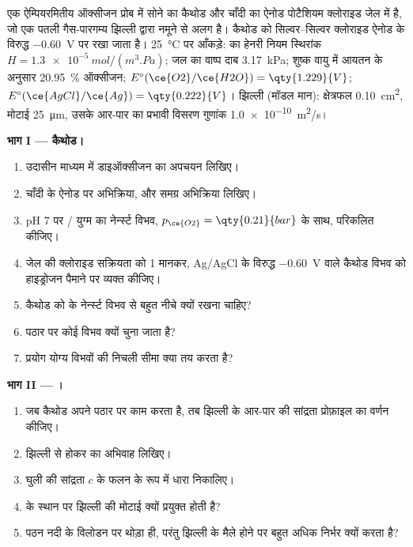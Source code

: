 \begin{problem}
\label{pb:b2:current-potential-curves:1}
एक ऐम्पियरमितीय ऑक्सीजन प्रोब में सोने का कैथोड और चाँदी का ऐनोड
पोटैशियम क्लोराइड जेल में है, जो एक पतली गैस-पारगम्य
झिल्ली द्वारा नमूने से अलग है। कैथोड को सिल्वर--सिल्वर
क्लोराइड ऐनोड के विरुद्ध \qty{-0.60}{V} पर रखा जाता है। \qty{25}{\degreeCelsius} पर आँकड़े:
 का हेनरी नियम स्थिरांक $H = \qty{1.3e-5}{mol/(m^3.Pa)}$; जल का वाष्प दाब
\qty{3.17}{kPa}; शुष्क वायु में आयतन के अनुसार 20.95~\% ऑक्सीजन; $E^\circ(\ce{O2}/\ce{H2O}) =
\qty{1.229}{V}$; $E^\circ(\ce{AgCl}/\ce{Ag}) = \qty{0.222}{V}$। झिल्ली (मॉडल
मान): क्षेत्रफल \qty{0.10}{cm^2}, मोटाई \qty{25}{\micro m}, उसके आर-पार  का
प्रभावी विसरण गुणांक \qty{1.0e-10}{m^2/s}।

\medskip
\noindent\textbf{भाग I --- कैथोड।}
\begin{enumerate}
  \item उदासीन माध्यम में डाइऑक्सीजन का अपचयन लिखिए।
  \item चाँदी के ऐनोड पर अभिक्रिया, और समग्र अभिक्रिया लिखिए।
  \item pH 7 पर / युग्म का नेर्न्स्ट विभव,
        $p_{\ce{O2}} = \qty{0.21}{bar}$ के साथ, परिकलित कीजिए।
  \item जेल की क्लोराइड सक्रियता को 1 मानकर, Ag/AgCl के विरुद्ध \qty{-0.60}{V} वाले कैथोड
        विभव को हाइड्रोजन पैमाने पर व्यक्त कीजिए।
  \item कैथोड को  के नेर्न्स्ट विभव से बहुत नीचे क्यों रखना चाहिए?
  \item पठार पर कोई विभव क्यों चुना जाता है?
  \item प्रयोग योग्य विभवों की निचली सीमा क्या तय करता है?
\end{enumerate}

\medskip
\noindent\textbf{भाग II --- ।}
\begin{enumerate}[resume]
  \item जब कैथोड अपने पठार पर काम करता है, तब झिल्ली के आर-पार  की
        सांद्रता प्रोफ़ाइल का वर्णन कीजिए।
  \item झिल्ली से होकर  का अभिवाह लिखिए।
  \item घुली  की सांद्रता $c$ के फलन के रूप में धारा
        निकालिए।
  \item {} के स्थान पर झिल्ली की मोटाई क्यों प्रयुक्त होती है?
  \item पठन नदी के विलोडन पर थोड़ा ही, परंतु झिल्ली के मैले होने पर बहुत अधिक
        निर्भर क्यों करता है?
\end{enumerate}


\end{problem}
